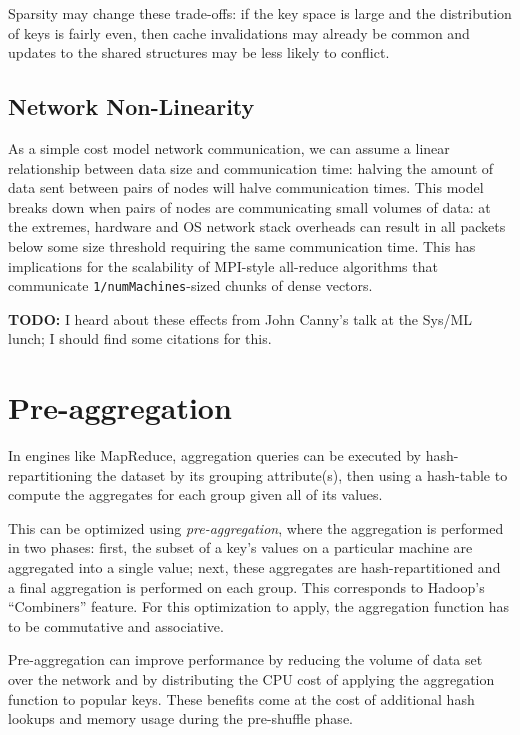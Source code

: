 \documentclass[12pt]{article}
\begin{document}
Sparsity may change these trade-offs: if the key space is large and the
distribution of keys is fairly even, then cache invalidations may already be
common and updates to the shared structures may be less likely to conflict.

\subsection{Network Non-Linearity}

As a simple cost model network communication, we can assume a linear relationship between data size and communication time: halving the amount of data sent between pairs of nodes will halve communication times.
This model breaks down when pairs of nodes are communicating small volumes of data: at the extremes, hardware and OS network stack overheads can result in all packets below some size threshold requiring the same communication time.
This has implications for the scalability of MPI-style all-reduce algorithms that communicate \texttt{1/numMachines}-sized chunks of dense vectors.

\textbf{TODO:} I heard about these effects from John Canny's talk at the Sys/ML lunch; I should find some citations for this.


\section{Pre-aggregation}

In engines like MapReduce, aggregation queries can be executed by
hash-repartitioning the dataset by its grouping attribute(s), then using
a hash-table to compute the aggregates for each group given all of its values.

This can be optimized using \emph{pre-aggregation}, where the aggregation is
performed in two phases: first, the subset of a key's values on a particular
machine are aggregated into a single value; next, these aggregates are
hash-repartitioned and a final aggregation is performed on each group.
This corresponds to Hadoop's ``Combiners'' feature.
For this optimization to apply, the aggregation function has to be commutative
and associative.

Pre-aggregation can improve performance by reducing the volume of data set
over the network and by distributing the CPU cost of applying the aggregation
function to popular keys.
These benefits come at the cost of additional hash lookups and memory usage
during the pre-shuffle phase.
\end{document}
